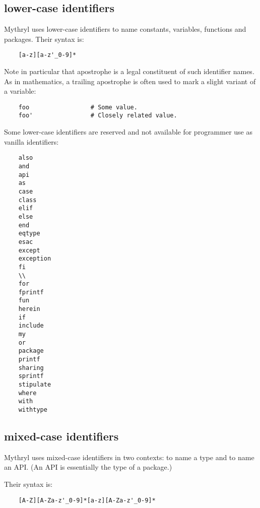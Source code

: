 \cutend*


\subsection{lower-case identifiers}
\label{section:ref:identifiers:lower-case}

Mythryl uses lower-case identifiers to name constants,
variables, functions and packages.  Their syntax is:

\begin{verbatim}
    [a-z][a-z'_0-9]*
\end{verbatim}

Note in particular that apostrophe is a legal constituent 
of such identifier names.  As in mathematics, a trailing 
apostrophe is often used to mark a slight variant of a 
variable:

\begin{verbatim}
    foo                 # Some value.
    foo'                # Closely related value.
\end{verbatim}

Some lower-case identifiers are reserved and not 
available for programmer use as vanilla identifiers:

\begin{verbatim}
    also
    and
    api
    as
    case
    class
    elif
    else
    end
    eqtype
    esac
    except
    exception
    fi
    \\
    for
    fprintf
    fun
    herein
    if
    include
    my
    or
    package
    printf
    sharing
    sprintf
    stipulate
    where
    with
    withtype
\end{verbatim}


\cutend*

\subsection{mixed-case identifiers}
\label{section:ref:identifiers:mixed-case}

Mythryl uses mixed-case identifiers in two 
contexts: to name a type and to name an API. 
(An API is essentially the type of a package.)

Their syntax is:

\begin{verbatim}
    [A-Z][A-Za-z'_0-9]*[a-z][A-Za-z'_0-9]*
\end{verbatim}

